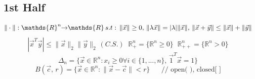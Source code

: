 \documentclass[twocolumn,12pt]{article}    %
\begin{document}
\footnotesize %
\subsection*{1st Half}
\begin{equation*}
    \|\cdot\| : \mathds{R}^n \hspace{-3pt} \to \hspace{-3pt} \mathds{R} \, s. t:\, \|\Vec{x}\| \geq 0, \, \|\lambda \Vec{x}\| = |\lambda| \|\Vec{x}\|, \, \|\Vec{x}+\Vec{y}\| \leq \|\Vec{x}\| +\|\Vec{y}\|
\end{equation*}
\begin{equation*}
    |\Vec{x}^T\Vec{y}| \leq \|\Vec{x}\|_2 \|\Vec{y}\|_2   \, (C.S.)\hspace{7pt} \mathds{R}^n_+ = \{\mathds{R}^n \geq0\}  \hspace{7pt} \mathds{R}^n_{++} = \{\mathds{R}^n > 0\}
\end{equation*}
\begin{equation*}
    \Delta_n  = \{\Vec{x} \in \mathds{R}^n : x_i\geq 0 \forall i \in \{1,...,n\},\, \Vec{1}^T\vec{x} = 1\}
\end{equation*}
\begin{equation*}
    B(\vec{c},\,r) = \{\vec{x} \in \mathds{R}^n : \|\vec{x} -\vec{c}\| < r\} \hspace{20pt} \text{// open( ), closed[ ]}
\end{equation*}
\end{document}

